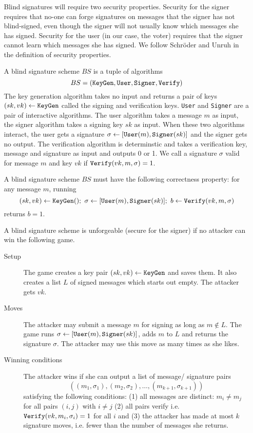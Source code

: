 \documentclass{llncs}
\newcommand{\alg}[1]{\textup{\texttt{#1}}}
\begin{document}
Blind signatures will require two security properties. Security for the signer
requires that no-one can forge signatures on messages that the signer has not
blind-signed, even though the signer will not usually know which messages she
has signed. Security for the user (in our case, the voter) requires that the
signer cannot learn which messages she has signed. We follow Schr\"oder and
Unruh \cite{US11} in the definition of security properties.

\begin{definition}
A blind signature scheme $BS$ is a tuple of algorithms
\[
BS = \left(
\alg{KeyGen}, \alg{User}, \alg{Signer}, \alg{Verify}
\right)
\]
The key generation algorithm takes no input and returns a pair of keys $(sk, vk)
\gets \alg{KeyGen}$ called the signing and verification keys. \alg{User} and
\alg{Signer} are a pair of interactive algorithms. The user algorithm takes a
message $m$ as input, the signer algorithm takes a signing key $sk$ as input.
When these two algorithms interact, the user gets a signature $\sigma \gets
[\alg{User}(m), \alg{Signer}(sk)]$ and the signer gets no output.
The verification algorithm is determinstic and takes a verification key, message
and signature as input and outputs 0 or 1. We call a signature $\sigma$ valid
for message $m$ and key $vk$ if $\alg{Verify}(vk, m, \sigma) = 1$.

A blind signature scheme $BS$ must have the following correctness property: for
any message $m$, running
\[
(sk, vk) \gets \alg{KeyGen}();\ \sigma \gets [\alg{User}(m), \alg{Signer}(sk)];\ 
b \gets \alg{Verify}(vk, m, \sigma)
\]
returns $b = 1$.
\end{definition}

\begin{definition}
A blind signature scheme is unforgeable (secure for the signer) if no attacker
can win the following game.

\begin{description}
\item[Setup] The game creates a key pair $(sk, vk) \gets \alg{KeyGen}$ and saves
them. It also creates a list $L$ of signed messages which starts out empty. The
attacker gets $vk$.

\item[Moves] The attacker may submit a message $m$ for signing as long as
$m \notin L$. The game runs $\sigma \gets [\alg{User}(m), \alg{Signer}(sk)]$,
adds $m$ to $L$ and returns the signature $\sigma$. The attacker may use this
move as many times as she likes.

\item[Winning conditions] The attacker wins if she can output a list of message/
signature pairs
\[
((m_1, \sigma_1), (m_2, \sigma_2), \ldots, (m_{k+1}, \sigma_{k+1}))
\]
satisfying the following conditions: (1) all messages are distinct: $m_i \neq m_j$
for all pairs $(i, j)$ with $i \neq j$ (2) all pairs verify i.e.
$\alg{Verify}(vk, m_i, \sigma_i) = 1$ for all $i$ and
(3) the attacker has made at most $k$ signature moves, i.e. fewer than the number
of messages she returns.
\end{description}
\end{definition}
\end{document}
